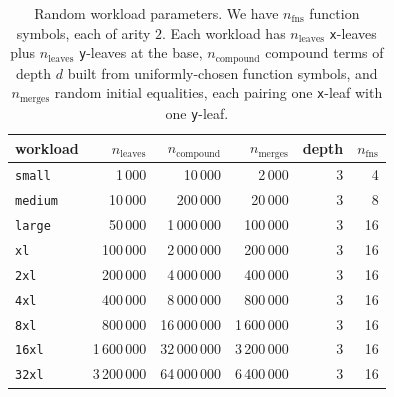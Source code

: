 
\begin{table}[!tb]
  \centering
  \begin{tabular}{l r r r r r}
    \toprule
    workload & $n_{\text{leaves}}$ & $n_{\text{compound}}$ & $n_{\text{merges}}$
    & depth & $n_{\text{fns}}$ \\
    \midrule
    \texttt{small}  &      1\,000 &     10\,000 &      2\,000 & 3 &  4 \\
    \texttt{medium}  &     10\,000 &    200\,000 &     20\,000 & 3 &  8 \\
    \texttt{large}  &     50\,000 &  1\,000\,000 &    100\,000 & 3 & 16 \\
    \texttt{xl}   &    100\,000 &  2\,000\,000 &    200\,000 & 3 & 16 \\
    \texttt{2xl}  &    200\,000 &  4\,000\,000 &    400\,000 & 3 & 16 \\
    \texttt{4xl}  &    400\,000 &  8\,000\,000 &    800\,000 & 3 & 16 \\
    \texttt{8xl}  &    800\,000 & 16\,000\,000 & 1\,600\,000 & 3 & 16 \\
    \texttt{16xl} &  1\,600\,000 & 32\,000\,000 & 3\,200\,000 & 3 & 16 \\
    \texttt{32xl} &  3\,200\,000 & 64\,000\,000 & 6\,400\,000 & 3 & 16 \\
    \bottomrule
  \end{tabular}
  \caption{Random workload parameters. We have $n_{\text{fns}}$ function
  symbols, each of arity $2$. Each workload has $n_{\text{leaves}}$
  \texttt{x}-leaves plus $n_{\text{leaves}}$ \texttt{y}-leaves at the base,
  $n_{\text{compound}}$ compound terms of depth $d$ built from
  uniformly-chosen function symbols, and $n_{\text{merges}}$ random initial
  equalities, each pairing one \texttt{x}-leaf with one \texttt{y}-leaf.
  }
  \label{tab:workloads}
\end{table}


